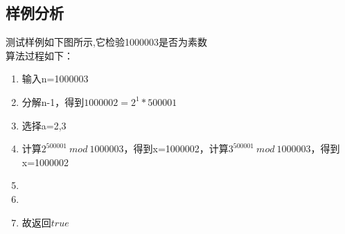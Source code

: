 \documentclass[UTF8,a4paperdui, %
]{ctexart}
\begin{document}
\subsection{样例分析}
测试样例如下图所示,它检验1000003是否为素数
\\
算法过程如下：
\begin{enumerate}
    \item 输入n=1000003
    \item 分解n-1，得到$1000002=2^1*500001$
    \item 选择a=2,3
    \item 计算$2^{500001}\ mod\ 1000003$，得到x=1000002，计算$3^{500001}\ mod\ 1000003$，得到x=1000002
    \item {}
    \item {}
    \item 故返回$true$
\end{enumerate}
\end{document}
